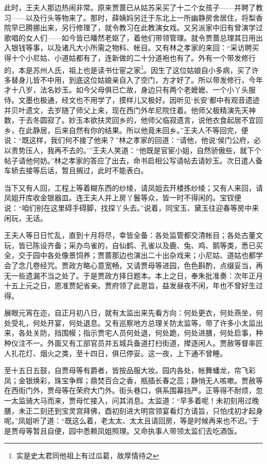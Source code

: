 \documentclass[12pt,oneside]{book}
\begin{document}
此时，王夫人那边热闹非常。原来贾蔷已从姑苏采买了十二个女孩子——并聘了教习——以及行头等物来了。那时，薛姨妈另迁于东北上一所幽静房舍居住，将梨香院早已腾挪出来，另行修理了，就令教习在此教演女戏。又另派家中旧有曾演学过歌唱的女人们——如今皆已皤然老妪了，着他们带领管理。就令贾蔷总理其日用出入银钱等事，以及诸凡大小所需之物料、帐目。又有林之孝家的来回：“采访聘买得十个小尼姑、小道姑都有了，连新做的二十分道袍也有了。外有一个带发修行的，本是苏州人氏，祖上也是读书仕宦之家\footnote{实是史太君同他祖上有过瓜葛，故厚情待之}。因生了这位姑娘自小多病，买了许多替身儿皆不中用，到底这位姑娘亲自入了空门，方才好了。所以带发修行，今年才十八岁，法名妙玉。如今父母俱已亡故，身边只有两个老嬷嬷、一个小丫头服侍。文墨也极通，经文也不用学了，摸样儿又极好。因听见‘长安’都中有观音遗迹并贝叶遗文，去岁随了师父上来，现在西门外牟尼院住着。他师父极精演先天神数，于去冬圆寂了。妙玉本欲扶灵回乡的，他师父临寂遗言，说他衣食起居不宜回乡，在此静居，后来自然有你的结果。所以他竟未回乡。”王夫人不等回完，便说：“既这样，我们何不接了他来？”林之孝家的回道：“请他，他说‘侯门公府，必以贵势压人，我再不去的。’”王夫人笑道：“他既是官宦小姐，自然骄傲些，就下个帖子请他何妨。”林之孝家的答应了出去，命书启相公写请帖去请妙玉。次日遣人备车轿去接等后话，暂且搁过，此时不能表白。

当下又有人回，工程上等着糊东西的纱绫，请凤姐去开楼拣纱绫；又有人来回，请凤姐开库收金银器皿。连王夫人并上房丫鬟等众，皆一时不得闲的。宝钗便说：“咱们别在这里碍手碍脚，找探丫头去。”说着，同宝玉、黛玉往迎春等房中来闲玩，无话。

王夫人等日日忙乱，直到十月将尽，幸皆全备：各处监管都交清帐目；各处古董文玩，皆已陈设齐备；采办鸟雀的，自仙鹤、孔雀以及鹿、兔、鸡、鹅等类，悉已买全，交于园中各处像景饲养；贾蔷那边也演出二十出杂戏来；小尼姑、道姑也都学会了念几卷经咒。贾政方略心意宽畅，又请贾母等进园，色色斟酌，点缀妥当，再无一些遗漏不当之处了。于是贾政方择日题本。本上之日，奉朱批准奏：次年正月十五上元之日，恩准贾妃省亲。贾府领了此恩旨，益发昼夜不闲，年也不曾好生过得。

展眼元宵在迩，自正月初八日，就有太监出来先看方向：何处更衣，何处燕坐，何处受礼，何处开宴，何处退息。又有巡察地方总理关防太监等，带了许多小太监出来，各处关防，挡围幙；指示贾宅人员何处退，何处跪，何处进膳，何处启事，种种仪注不一。外面又有工部官员并五城兵备道打扫街道，撵逐闲人。贾赦等督率匠人扎花灯、烟火之类，至十四日，俱已停妥。这一夜，上下通不曾睡。

至十五日五鼓，自贾母等有爵者，皆按品服大妆。园内各处，帐舞蟠龙，帘飞彩凤；金银焕彩，珠宝争辉；鼎焚百合之香，瓶插长春之蕊；静悄无人咳嗽。贾赦等在西街门外，贾母等在荣府大门外。街头巷口，俱系围幕挡严。正等得不耐烦，忽一太监骑大马而来，贾母忙接入，问其消息。太监道：“早多着呢！未初刻用过晚膳，未正二刻还到宝灵宫拜佛，酉初刻进大明宫领宴看灯方请旨，只怕戌初才起身呢。”凤姐听了道：“既这么着，老太太、太太且请回房，等是时候再来也不迟。”于是贾母等暂且自便，园中悉赖凤姐照理。又命执事人带领太监们去吃酒饭。
\end{document}
